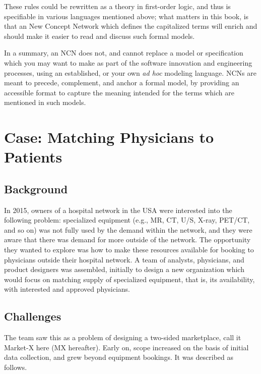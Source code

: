 \documentclass[graybox,envcountchap,sectrefs]{svmono}
\newcommand{\ncn}{NCN}
\newcommand{\ncnf}{New Concept Network}
\begin{document}
These rules could be rewritten as a theory in first-order logic, and thus is specifiable in various languages mentioned above; what matters in this book, is that an \ncnf{} which defines the capitalized terms will enrich and should make it easier to read and discuss such formal models.

In a summary, an \ncn{} does not, and cannot replace a model or specification which you may want to make as part of the software innovation and engineering processes, using an established, or your own \textit{ad hoc} modeling language. \ncn s are meant to precede, complement, and anchor a formal model, by providing an accessible format to capture the meaning intended for the terms which are mentioned in such models. 

\chapter{Case: Matching Physicians to Patients}\label{c:case:matching-physicians-to-patients}

\section{Background}
In 2015, owners of a hospital network in the USA were interested into the following problem: specialized equipment (e.g., MR, CT, U/S, X-ray, PET/CT, and so on) was not fully used by the demand within the network, and they were aware that there was demand for more outside of the network. The opportunity they wanted to explore was how to make these resources available for booking to physicians outside their hospital network. A team of analysts, physicians, and product designers was assembled, initially to design a new organization which would focus on matching supply of specialized equipment, that is, its availability, with interested and approved physicians. 

\section{Challenges}
The team saw this as a problem of designing a two-sided marketplace, call it Market-X here (MX hereafter). Early on, scope increased on the basis of initial data collection, and grew beyond equipment bookings. It was described as follows.
\end{document}
